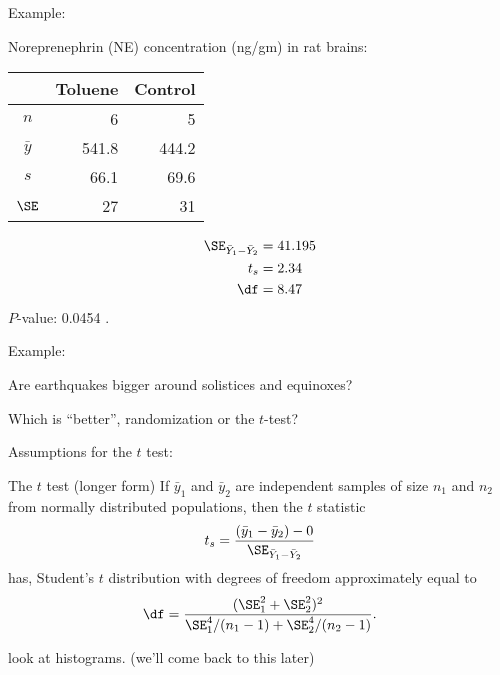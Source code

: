 \begin{frame}{Example: }

    Noreprenephrin (NE) concentration (ng/gm) in rat brains:
    \begin{center}
      \begin{tabular}{c|rr}
            & Toluene & Control \\
          \hline
          $n$ & 6 & 5 \\
          $\bar y$ & 541.8 & 444.2 \\
          $s$  & 66.1 & 69.6 \\
          $\SE$ & 27 & 31 \\
     \end{tabular}
   \end{center}


     \pause
     \begin{align*}
         \SE_{\bar Y_1 - \bar Y_2} &= 41.195 \\
         t_s &= 2.34  \\
         \df &= 8.47 
     \end{align*}
     $P$-value: 0.0454 .

\end{frame}


\begin{frame}{Example:}


    Are earthquakes bigger around solistices and equinoxes?

    \pause

    Which is ``better'', randomization or the $t$-test?

\end{frame}

\begin{frame}{Assumptions for the $t$ test:}

     \begin{block}{The $t$ test (longer form)}
         If $\bar y_1$ and $\bar y_2$ are independent samples of size $n_1$ and $n_2$
         from normally distributed populations,
         then the \alert{$t$ statistic}
         \[ t_s = \frac{ (\bar y_1 - \bar y_2) - 0 }{ \SE_{\bar Y_1 - \bar Y_2} } \]
         has, Student's $t$ distribution
         with degrees of freedom approximately equal to
         \[ \df = \frac{ (\SE_1^2 + \SE_2^2)^2 }{ \SE_1^4/(n_1-1) + \SE_2^4/(n_2-1) } . \]
     \end{block}

     \vspace{2em}

      look at histograms.  (we'll come back to this later)
 
\end{frame}


